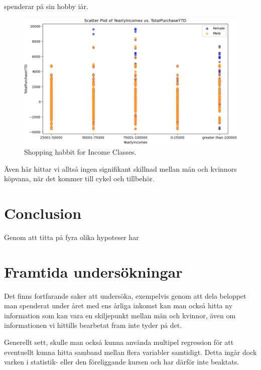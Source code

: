 \documentclass[]{article}
\begin{document}
spenderar på sin hobby iår.
\begin{figure}[h]
    \centering
    \includegraphics[width=\textwidth]{img_shopping_habbit_for_income_classes.png}
    \caption{Shopping habbit for Income Classes.}
\end{figure}

Även här hittar vi alltså ingen signifikant skillnad mellan män och kvinnors köpvana, när det kommer till cykel och tillbehör.

\section{Conclusion}

Genom att titta på fyra olika hypoteser har 



\section{Framtida undersökningar}

Det finns fortfarande saker att undersöka, exempelvis genom att dela beloppet man spenderat under året med ens årliga inkomst kan man också hitta ny information som kan vara en skiljepunkt mellan män och kvinnor, även om informationen vi hittills bearbetat fram inte tyder på det.

Generellt sett, skulle man också kunna använda multipel regression för att eventuellt kunna hitta samband mellan flera variabler samtidigt. Detta ingår dock varken i statistik- eller den föreliggande kursen och har därför inte beaktats.
\end{document}
